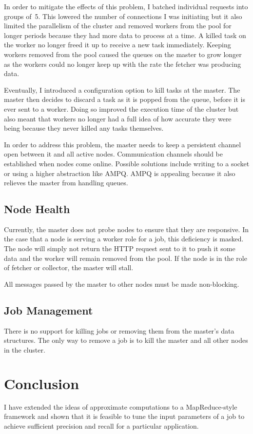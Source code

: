 \documentclass[12pt,twocolumn]{article}
\begin{document}
In order to mitigate the effects of this problem, I batched individual requests into groups of~5. This
lowered the number of connections I was initiating but it also limited the parallelism of the cluster
and removed workers from the pool for longer periods because they had more data to process at a time.
A killed task on the worker no longer freed it up to receive a new task immediately.
Keeping workers removed from the pool caused the queues on the master to grow longer as the workers
could no longer keep up with the rate the fetcher was producing data.

Eventually, I introduced a configuration option to kill tasks at the master. The master then
decides to discard a task as it is popped from the queue, before it is ever sent to a worker.
Doing so improved the execution time of the cluster but also meant that workers no longer had
a full idea of how accurate they were being because they never killed any tasks themselves.

In order to address this problem, the master needs to keep a persistent channel open between
it and all active nodes. Communication channels should be established when nodes come online.
Possible solutions include writing to a socket or using a higher abstraction like AMPQ\@.
AMPQ is appealing because it also relieves the master from handling queues.

\subsection{Node Health}
Currently, the master does not probe nodes to ensure that they are responsive. In the case that
a node is serving a worker role for a job, this deficiency is masked. The node will simply not
return the HTTP request sent to it to push it some data and the worker will remain removed from
the pool. If the node is in the role of fetcher or collector, the master will stall.

All messages passed by the master to other nodes must be made non-blocking.

\subsection{Job Management}
There is no support for killing jobs or removing them from the master's data structures. The only
way to remove a job is to kill the master and all other nodes in the cluster.

\section{Conclusion}
I have extended the ideas of approximate computations to a MapReduce-style framework and shown
that it is feasible to tune the input parameters of a job to achieve sufficient precision and
recall for a particular application.
\end{document}
